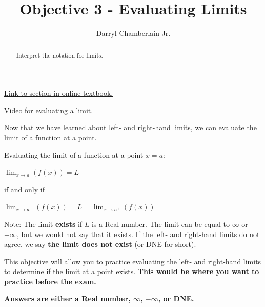 \documentclass{ximera}
\author{Darryl Chamberlain Jr.}
\title{Objective 3 - Evaluating Limits}
\begin{document}
\begin{abstract}
Interpret the notation for limits.
\end{abstract}
\maketitle

\href{https://cnx.org/contents/i4nRcikn@5.1:dKCfyV9u@5/The-Limit-of-a-Function}{Link to section in online textbook.}

\href{https://www.youtube.com/watch?v=riXcZT2ICjA}{Video for evaluating a limit.}


Now that we have learned about left- and right-hand limits, we can evaluate the limit of a function at a point.

\begin{theorem}
	Evaluating the limit of a function at a point $x=a$:
	\begin{center}

		$\lim_{x \rightarrow a} (f(x)) = L$

		if and only if

		$\lim_{x \rightarrow a^{-}} (f(x)) = L = \lim_{x \rightarrow a^{+}} (f(x))$
	\end{center}

	Note: The limit \textbf{exists} if $L$ is a Real number. The limit can be equal to $\infty$ or $-\infty$, but we would not say that it exists. If the left- and right-hand limits do not agree, we say \textbf{the limit does not exist} (or DNE for short).
\end{theorem}

This objective will allow you to practice evaluating the left- and right-hand limits to determine if the limit at a point exists. \textbf{This would be where you want to practice before the exam.}

\textbf{Answers are either a Real number, $\infty$, $-\infty$, or DNE.}
\end{document}
